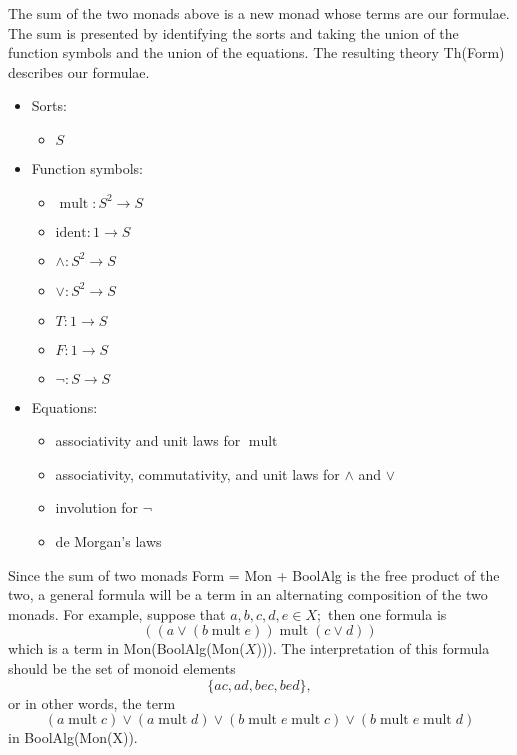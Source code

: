 \documentclass{article}
\newcommand{\maps}{\colon}
\newcommand{\mult}{\mathop{\mathrm{mult}}}
\newcommand{\ident}{\mathrm{ident}}
\begin{document}
The sum of the two monads above is a new monad whose terms are our formulae.  The sum is presented by identifying the sorts and taking the union of the function symbols and the union of the equations.  The resulting theory Th(Form) describes our formulae.
\begin{center}
  \begin{itemize}
    \item Sorts:
    \begin{itemize}
      \item $S$
    \end{itemize}
    \item Function symbols:
    \begin{itemize}
      \item $\mult\maps S^2 \to S$
      \item $\ident\maps 1 \to S$
      \item $\land\maps S^2 \to S$
      \item $\lor\maps S^2 \to S$
      \item $T\maps 1 \to S$
      \item $F\maps 1 \to S$
      \item $\neg\maps S \to S$
    \end{itemize}
    \item Equations:
    \begin{itemize}
      \item associativity and unit laws for $\mult$
      \item associativity, commutativity, and unit laws for $\land$ and $\lor$
      \item involution for $\neg$
      \item de Morgan's laws
    \end{itemize}
  \end{itemize}
\end{center}
Since the sum of two monads Form = Mon + BoolAlg is the free product of the two, a general formula will be a term in an alternating composition of the two monads.  For example, suppose that $a, b, c, d, e \in X;$ then one formula is
\[ (({a}\lor{(b \mult e)}) \mult ({c}\lor{d})) \]
which is a term in Mon(BoolAlg(Mon($X$))).  The interpretation of this formula should be the set of monoid elements
\[ \{ ac, ad, bec, bed \}, \]
or in other words, the term
\[ (a \mult c) \lor (a \mult d) \lor (b \mult e \mult c) \lor (b \mult e \mult d) \]
in BoolAlg(Mon(X)).
\end{document}
